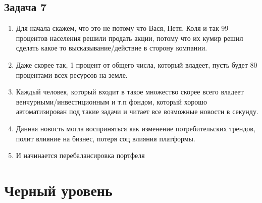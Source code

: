 \documentclass[a4paper,12pt]{article}
\begin{document}
\subsection{Задача 7}
\begin{enumerate}
    \item Для начала скажем, что это не потому что Вася, Петя, Коля и так 99 процентов населения решили продать акции, потому что их кумир решил сделать какое то высказывание/действие в сторону компании.
    \item Даже скорее так, 1 процент от общего числа, который владеет, пусть будет 80 процентами всех ресурсов на земле.
    \item Каждый человек, который входит в такое множество скорее всего владеет венчурными/инвестиционным и т.п фондом, который хорошо автоматизирован под такие задачи и читает все возможные новости в секунду.
    \item Данная новость могла восприняться как изменение потребительских трендов, полит влияние на бизнес, потеря соц влияния платформы.
    \item И начинается перебалансировка портфеля
\end{enumerate}

\section{Черный уровень}
\end{document}
